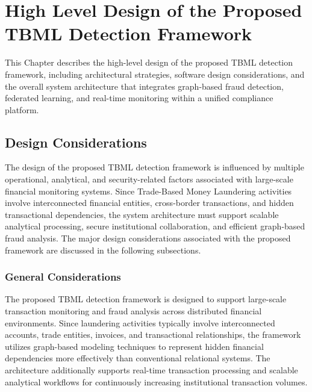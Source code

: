 \chapter{High Level Design of the Proposed TBML Detection Framework}

This Chapter describes the high-level design of the proposed TBML detection framework, including architectural strategies, software design considerations, and the overall system architecture that integrates graph-based fraud detection, federated learning, and real-time monitoring within a unified compliance platform.

\section[Design Considerations]{\textbf{Design Considerations}}

The design of the proposed TBML detection framework is influenced by multiple operational, analytical, and security-related factors associated with large-scale financial monitoring systems. Since Trade-Based Money Laundering activities involve interconnected financial entities, cross-border transactions, and hidden transactional dependencies, the system architecture must support scalable analytical processing, secure institutional collaboration, and efficient graph-based fraud analysis. The major design considerations associated with the proposed framework are discussed in the following subsections.

\subsection[General Considerations]{\textbf{General Considerations}}

The proposed TBML detection framework is designed to support large-scale transaction monitoring and fraud analysis across distributed financial environments. Since laundering activities typically involve interconnected accounts, trade entities, invoices, and transactional relationships, the framework utilizes graph-based modeling techniques to represent hidden financial dependencies more effectively than conventional relational systems. The architecture additionally supports real-time transaction processing and scalable analytical workflows for continuously increasing institutional transaction volumes.

